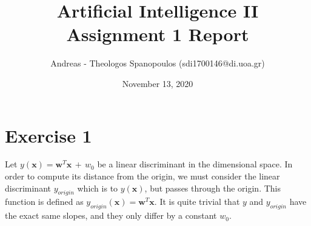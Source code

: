 \documentclass[12pt]{report}
\title{Artificial Intelligence II \\ Assignment 1 Report}
\author{Andreas - Theologos Spanopoulos (sdi1700146@di.uoa.gr)}
\date{November 13, 2020}
\begin{document}
\maketitle

\section*{Exercise 1}
Let $y(\textbf{x}) = \textbf{w}^T\textbf{x} \,+\, w_0$ be a linear discriminant in the
 dimensional space. In order to compute its distance from the origin,
we must consider the linear discriminant $y_{origin}$ which is  to
$y(\textbf{x})$, but passes through the origin. This function is defined as
$y_{origin}(\textbf{x}) = \textbf{w}^T\textbf{x}$. It is quite trivial that $y$ and
$y_{origin}$ have the exact same slopes, and they only differ by a constant $w_0$.



\clearpage
\end{document}
